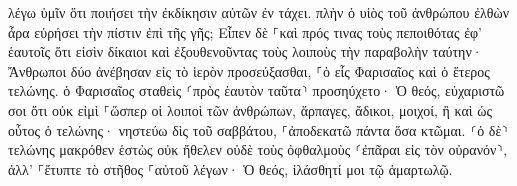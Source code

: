 \documentclass{openreader}
\begin{document}
λέγω ὑμῖν ὅτι ποιήσει τὴν ἐκδίκησιν αὐτῶν ἐν τάχει. πλὴν ὁ υἱὸς τοῦ ἀνθρώπου ἐλθὼν ἆρα εὑρήσει τὴν πίστιν ἐπὶ τῆς γῆς; 
Εἶπεν δὲ ⸀καὶ πρός τινας τοὺς πεποιθότας ἐφ’ ἑαυτοῖς ὅτι εἰσὶν δίκαιοι καὶ ἐξουθενοῦντας τοὺς λοιποὺς τὴν παραβολὴν ταύτην· 
Ἄνθρωποι δύο ἀνέβησαν εἰς τὸ ἱερὸν προσεύξασθαι, ⸀ὁ εἷς Φαρισαῖος καὶ ὁ ἕτερος τελώνης. 
ὁ Φαρισαῖος σταθεὶς ⸂πρὸς ἑαυτὸν ταῦτα⸃ προσηύχετο· Ὁ θεός, εὐχαριστῶ σοι ὅτι οὐκ εἰμὶ ⸀ὥσπερ οἱ λοιποὶ τῶν ἀνθρώπων, ἅρπαγες, ἄδικοι, μοιχοί, ἢ καὶ ὡς οὗτος ὁ τελώνης· 
νηστεύω δὶς τοῦ σαββάτου, ⸀ἀποδεκατῶ πάντα ὅσα κτῶμαι. 
⸂ὁ δὲ⸃ τελώνης μακρόθεν ἑστὼς οὐκ ἤθελεν οὐδὲ τοὺς ὀφθαλμοὺς ⸂ἐπᾶραι εἰς τὸν οὐρανόν⸃, ἀλλ’ ⸀ἔτυπτε τὸ στῆθος ⸀αὐτοῦ λέγων· Ὁ θεός, ἱλάσθητί μοι τῷ ἁμαρτωλῷ. 
\end{document}
